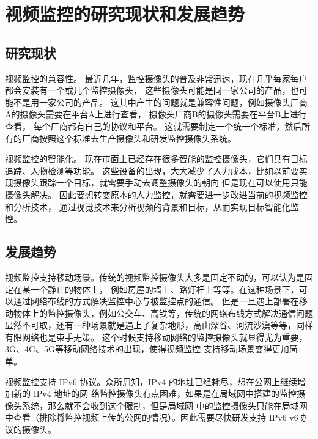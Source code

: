 

\section{视频监控的研究现状和发展趋势}
\subsection{研究现状}
视频监控的兼容性。
最近几年，监控摄像头的普及非常迅速，现在几乎每家每户都会安装有一个或几个监控摄像头，
这些摄像头可能是同一家公司的产品，也可能不是用一家公司的产品。
这其中产生的问题就是兼容性问题，例如摄像头厂商A的摄像头需要在平台A上进行查看，
摄像头厂商B的摄像头需要在平台B上进行查看，
每个厂商都有自己的协议和平台。
这就需要制定一个统一个标准，然后所有的厂商按照这个标准去生产摄像头和研发监控摄像头系统。


视频监控的智能化。
现在市面上已经存在很多智能的监控摄像头，它们具有目标追踪、人物检测等功能。
这些设备的出现，大大减少了人力成本，比如以前要实现摄像头跟踪一个目标，就需要手动去调整摄像头的朝向
但是现在可以使用只能摄像头解决。
因此要想转变原本的人力监控，就需要进一步改进当前的视频监控和分析技术，
通过视觉技术来分析视频的背景和目标，从而实现目标智能化监控。

\subsection{发展趋势}
视频监控支持移动场景。传统的视频监控摄像头大多是固定不动的，可以认为是固定在某一个静止的物体上，
例如房屋的墙上、路灯杆上等等。在这种场景下，可以通过网络布线的方式解决监控中心与被监控点的通信。
但是一旦遇上部署在移动物体上的监控摄像头，例如公交车、高铁等，传统的网络布线方式解决通信问题
显然不可取，还有一种场景就是遇上了复杂地形，高山深谷、河流沙漠等等，同样有限网络也是束手无策。
这个时候支持移动网络的监控摄像头就显得尤为重要，3G、4G、5G等移动网络技术的出现，使得视频监控
支持移动场景变得更加简单。

视频监控支持 IPv6 协议。众所周知，IPv4 的地址已经耗尽，想在公网上继续增加新的 IPv4 地址的网
络监控摄像头有点困难，如果是在局域网中搭建的监控摄像头系统，那么就不会收到这个限制，但是局域网
中的监控摄像头只能在局域网中查看（排除将监控视频上传的公网的情况）。因此需要尽快研发支持 IPv6
v6协议的摄像头。

